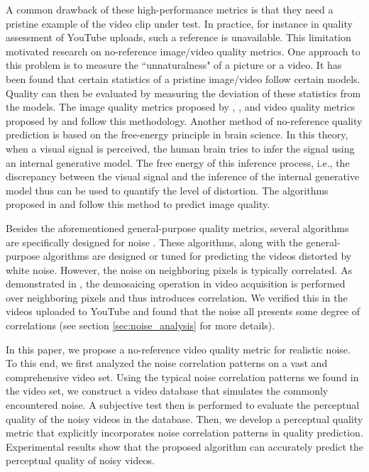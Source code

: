 \documentclass{sig-alternate}
\begin{document}
A common drawback of these high-performance metrics is that they need a pristine example of the video clip under test. In practice, for instance in quality assessment of YouTube uploads, such a reference is unavailable. This limitation motivated research on no-reference image/video quality metrics. One approach to this problem is to measure the ``unnaturalness" of a picture or a video. It has been found that certain statistics of a pristine image/video follow certain models\cite{SriLeeSimZhu2003}\cite{ZorWei2009}. Quality can then be evaluated by measuring the deviation of these statistics from the models. The image quality metrics proposed by \cite{NIQE}, \cite{DIIVINE}, \cite{HNR} and video quality metrics proposed by \cite{BLIINDS} and \cite{ZhuLiAsaSau2015} follow this methodology. Another method of no-reference quality prediction is based on the free-energy principle in brain science\cite{Fri2010}. In this theory, when a visual signal is perceived, the human brain tries to infer the signal using an internal generative model. The free energy of this inference process, i.e., the discrepancy between the visual signal and the inference of the internal generative model thus can be used to quantify the level of distortion. The algorithms proposed in \cite{LiuZhaZhaSunGuYan2014} and \cite{ZhaWuYanLinZha2012} follow this method to predict image quality.

Besides the aforementioned general-purpose quality metrics, several algorithms are specifically designed for noise \cite{LimPar2014,ZhaKauWanYan2013,ZhaWu2011}. These algorithms, along with the general-purpose algorithms are designed or tuned for predicting the videos distorted by white noise. However, the noise on neighboring pixels is typically correlated. As demonstrated in \cite{SeyKeiKnoSte2013}, the demosaicing operation in video acquisition is performed over neighboring pixels and thus introduces correlation. We verified this in the videos uploaded to YouTube and found that the noise all presents some degree of correlations (see section \ref{sec:noise_analysis} for more details).

In this paper, we propose a no-reference video quality metric for realistic noise. To this end, we first analyzed the noise correlation patterns on a vast and comprehensive video set. Using the typical noise correlation patterns we found in the video set, we construct a video database that simulates the commonly encountered noise. A subjective test then is performed to evaluate the perceptual quality of the noisy videos in the database. Then, we develop a perceptual quality metric that explicitly incorporates noise correlation patterns in quality prediction. Experimental results show that the proposed algorithm can accurately predict the perceptual quality of noisy videos. 
\end{document}
